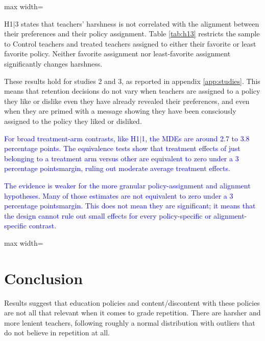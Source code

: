 \documentclass[12pt,a4paper]{article}
\newcommand{\tabpath}{../3. Output/tables/}
\newcommand{\pp}{percentage points}
\begin{document}
\begin{table}[H]
\centering
\caption{Study I: H1\(|\)1 and H1\(|\)2}
\label{tab:h1}
\begin{adjustbox}{max width=\textwidth}

\end{adjustbox}
\end{table}

H1\(|\)3 states that teachers' harshness is not correlated with the alignment between their preferences and their policy assignment. Table \ref{tab:h13} restricts the sample to Control teachers and treated teachers assigned to either their favorite or least favorite policy. Neither favorite assignment nor least-favorite assignment significantly changes harshness.

These results hold for studies 2 and 3, as reported in appendix \ref{app:studies}. This means that retention decisions do not vary when teachers are assigned to a policy they like or dislike even they have already revealed their preferences, and even when they are primed with a message showing they have been consciously assigned to the policy they liked or disliked.

\textcolor{blue}{For broad treatment-arm contrasts, like H1\(|\)1,  the MDEs are around 2.7 to 3.8 \pp. The equivalence tests show that treatment effects of just belonging to a treatment arm versus other are equivalent to zero under a 3 \pp margin, ruling out moderate average treatment effects.}

\textcolor{blue}{The evidence is weaker for the more granular policy-assignment and alignment hypotheses. Many of those estimates are not equivalent to zero under a 3 \pp margin. This does not mean they are significant; it means that the design cannot rule out small effects for every policy-specific or alignment-specific contrast.}

\begin{table}[H]
\centering
\caption{Study I: H1\(|\)3}
\label{tab:h13}
\begin{adjustbox}{max width=\textwidth}

\end{adjustbox}
\end{table}


\section{Conclusion}

Results suggest that education policies and content/discontent with these policies are not all that relevant when it comes to grade repetition. There are harsher and more lenient teachers, following roughly a normal distribution with outliers that do not believe in repetition at all.
\end{document}
